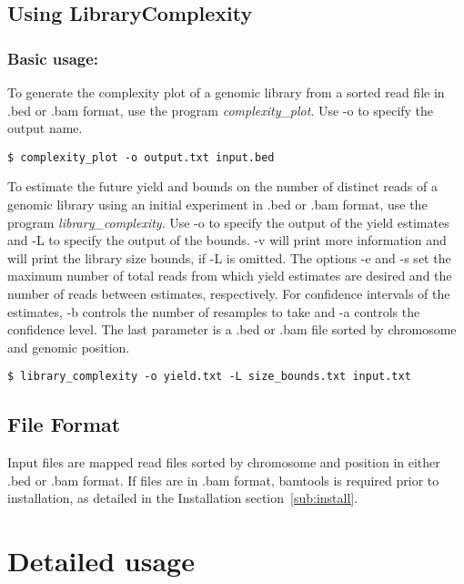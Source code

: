 \documentclass[11pt]{report}
\begin{document}
\section{Using LibraryComplexity}
\label{sec:usage}

\subsection{Basic usage:}
\label{sub:basic}

To generate the complexity plot of a genomic
library from a sorted read file in .bed or .bam format,
use the program \textit{complexity\_plot}.  Use
-o to specify the output name.

\begin{verbatim}
$ complexity_plot -o output.txt input.bed
\end{verbatim}

To estimate the future yield 
and bounds on the number of distinct reads
of a genomic library
using an initial experiment in .bed or .bam format,
use the program \textit{library\_complexity}.
Use -o to specify the output of the yield
estimates and -L to specify the output of
the bounds.  -v will print more information
and will print the library size bounds, if -L is 
omitted.  The options
-e and -s set the maximum number of 
total reads from which yield estimates are desired
and the number of reads between estimates, respectively.
For confidence intervals of the estimates, -b controls
the number of resamples to take and -a controls the confidence
level.  The last parameter is a .bed or .bam
file sorted by chromosome and genomic position.


\begin{verbatim}
$ library_complexity -o yield.txt -L size_bounds.txt input.txt
\end{verbatim}

\section{File Format}
\label{sec:format}

Input files are mapped read files sorted by
chromosome and position in either .bed or .bam 
format.  If files are in .bam format, bamtools is required
prior to installation, as detailed in the Installation 
section~\ref{sub:install}.

\chapter{Detailed usage}
\label{chap:detail}
\end{document}
